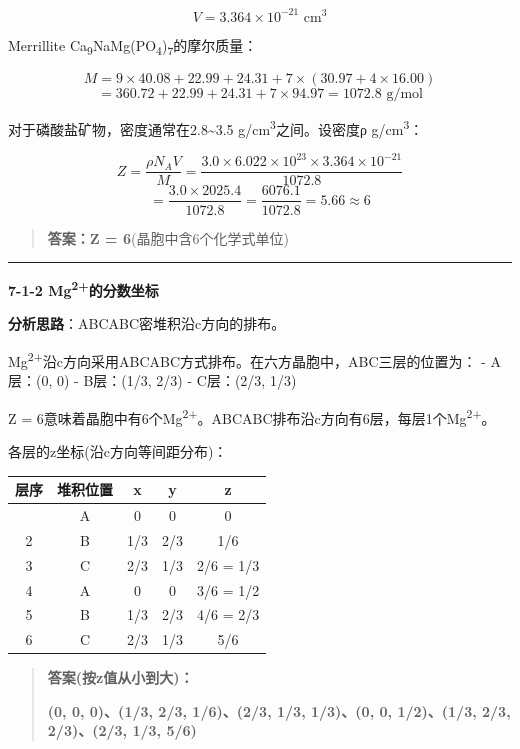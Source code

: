 \[V = 3.364 \times 10^{-21} \text{ cm}^3\]

Merrillite Ca\textsubscript{9}NaMg(PO\textsubscript{4})\textsubscript{7}的摩尔质量：

\[M = 9 \times 40.08 + 22.99 + 24.31 + 7 \times (30.97 + 4 \times 16.00)\]
\[= 360.72 + 22.99 + 24.31 + 7 \times 94.97 = 1072.8 \text{ g/mol}\]

对于磷酸盐矿物，密度通常在2.8\textasciitilde3.5 g/cm\textsuperscript{3}之间。设密度ρ  g/cm\textsuperscript{3}：

\[Z = \frac{\rho N_A V}{M} = \frac{3.0 \times 6.022 \times 10^{23} \times 3.364 \times 10^{-21}}{1072.8}\]
\[= \frac{3.0 \times 2025.4}{1072.8} = \frac{6076.1}{1072.8} = 5.66 \approx 6\]

\begin{quote}
\textbf{答案：Z = 6}(晶胞中含6个化学式单位)
\end{quote}

\begin{center}\rule{0.5\linewidth}{0.5pt}\end{center}

\textbf{7-1-2 Mg\textsuperscript{2+}的分数坐标}

\textbf{分析思路}：ABCABC密堆积沿c方向的排布。

Mg\textsuperscript{2+}沿c方向采用ABCABC方式排布。在六方晶胞中，ABC三层的位置为：
- A层：(0, 0)
- B层：(1/3, 2/3)
- C层：(2/3, 1/3)

Z = 6意味着晶胞中有6个Mg\textsuperscript{2+}。ABCABC排布沿c方向有6层，每层1个Mg\textsuperscript{2+}。

各层的z坐标(沿c方向等间距分布)：

{\def\LTcaptype{none} %
\begin{longtable}[]{@{}ccccc@{}}
\toprule\noalign{}
层序 & 堆积位置 & x & y & z \\
\midrule\noalign{}
\endhead
\bottomrule\noalign{}
\endlastfoot
1 & A & 0 & 0 & 0 \\
2 & B & 1/3 & 2/3 & 1/6 \\
3 & C & 2/3 & 1/3 & 2/6 = 1/3 \\
4 & A & 0 & 0 & 3/6 = 1/2 \\
5 & B & 1/3 & 2/3 & 4/6 = 2/3 \\
6 & C & 2/3 & 1/3 & 5/6 \\
\end{longtable}
}

\begin{quote}
\textbf{答案(按z值从小到大)：}

\textbf{(0, 0, 0)、(1/3, 2/3, 1/6)、(2/3, 1/3, 1/3)、(0, 0, 1/2)、(1/3, 2/3, 2/3)、(2/3, 1/3, 5/6)}
\end{quote}

